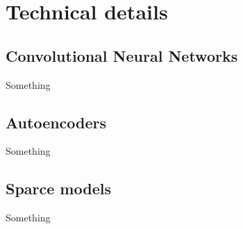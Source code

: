 
\chapter{Technical details}
\label{cha:tede}

\section{Convolutional Neural Networks}
Something \cite{Kempka2016}

\section{Autoencoders}
Something \cite{Kempka2016}

\section{Sparce models}
Something \cite{Kempka2016}
